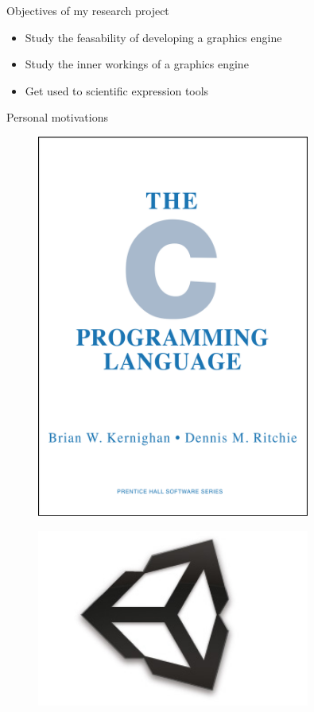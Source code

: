 \documentclass{beamer}
\begin{document}
\begin{frame}{Objectives of my research project}
  \begin{itemize}
  \item{Study the feasability of developing a graphics engine}
  \item{Study the inner workings of a graphics engine}
  \item{Get used to scientific expression tools}
  \end{itemize}
\end{frame}

\begin{frame}{Personal motivations}
  \begin{minipage}{0.5\textwidth}
    \begin{figure}
    \centering
    \includegraphics[width=0.8\textwidth]{img/c}
    \end{figure}
  \end{minipage}
  \begin{minipage}{0.45\textwidth}
    \begin{figure}
    \centering
    \includegraphics[width=0.8\textwidth]{img/unity}

\end{figure}
\end{minipage}
\end{frame}
\end{document}
